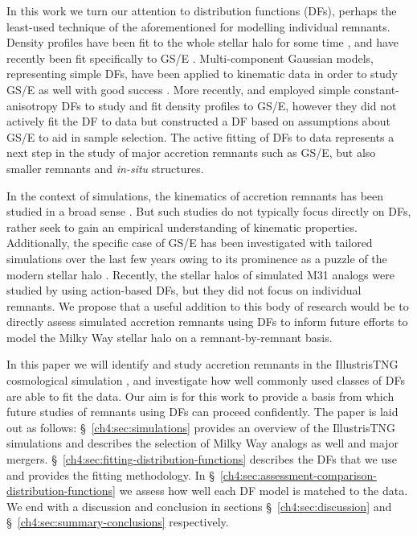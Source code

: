 In this work we turn our attention to distribution functions (DFs), perhaps the least-used technique of the aforementioned for modelling individual remnants. Density profiles have been fit to the whole stellar halo for some time \parencite[for contemporary examples see][]{deason19,mackereth20}, and have recently been fit specifically to GS/E \parencite{han22,lane23}. Multi-component Gaussian models, representing simple DFs, have been applied to kinematic data in order to study GS/E as well with good success \parencite[e.g.][]{lancaster19,fattahi19,iorio21}. More recently, \textcite{lane22} and \textcite{lane23} employed simple constant-anisotropy DFs to study and fit density profiles to GS/E, however they did not actively fit the DF to data but constructed a DF based on assumptions about GS/E to aid in sample selection. The active fitting of DFs to data represents a next step in the study of major accretion remnants such as GS/E, but also smaller remnants and \textit{in-situ} structures.

In the context of simulations, the kinematics of accretion remnants has been studied in a broad sense \parencite[e.g.][]{johnston08,deason13,amorisco17,jean-baptiste17}. But such studies do not typically focus directly on DFs, rather seek to gain an empirical understanding of kinematic properties. Additionally, the specific case of GS/E has been investigated with tailored simulations over the last few years owing to its prominence as a puzzle of the modern stellar halo \parencite{naidu21,amarante22}. Recently, the stellar halos of simulated M31 analogs were studied by \textcite{gherghinescu23} using action-based DFs, but they did not focus on individual remnants. We propose that a useful addition to this body of research would be to directly assess simulated accretion remnants using DFs to inform future efforts to model the Milky Way stellar halo on a remnant-by-remnant basis.

In this paper we will identify and study accretion remnants in the IllustrisTNG cosmological simulation \parencite{tng_public_release_nelson19}, and investigate how well commonly used classes of DFs are able to fit the data. Our aim is for this work to provide a basis from which future studies of remnants using DFs can proceed confidently. The paper is laid out as follows: \S~\ref{ch4:sec:simulations} provides an overview of the IllustrisTNG simulations and describes the selection of Milky Way analogs as well and major mergers. \S~\ref{ch4:sec:fitting-distribution-functions} describes the DFs that we use and provides the fitting methodology. In \S~\ref{ch4:sec:assessment-comparison-distribution-functions} we assess how well each DF model is matched to the data. We end with a discussion and conclusion in sections \S~\ref{ch4:sec:discussion} and \S~\ref{ch4:sec:summary-conclusions} respectively.


